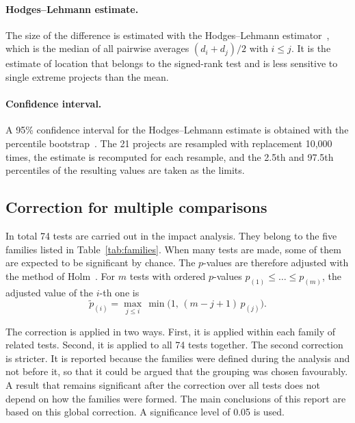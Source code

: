 \documentclass[12pt,a4paper,oneside]{report}
\begin{document}
\paragraph{Hodges--Lehmann estimate.} The size of the difference is
estimated with the Hodges--Lehmann estimator~\cite{hodges1963}, which is the
median of all pairwise averages $(d_i + d_j)/2$ with $i \le j$. It is the
estimate of location that belongs to the signed-rank test and is less
sensitive to single extreme projects than the mean.

\paragraph{Confidence interval.} A 95\% confidence interval for the
Hodges--Lehmann estimate is obtained with the percentile
bootstrap~\cite{efron1979bootstrap}. The 21 projects are resampled with
replacement 10,000 times, the estimate is recomputed for each resample, and
the 2.5th and 97.5th percentiles of the resulting values are taken as the
limits.

\subsection{Correction for multiple comparisons}

In total 74 tests are carried out in the impact analysis. They belong to the
five families listed in Table~\ref{tab:families}. When many tests are made,
some of them are expected to be significant by chance. The $p$-values are
therefore adjusted with the method of Holm~\cite{holm1979}. For $m$ tests
with ordered $p$-values $p_{(1)} \le \dots \le p_{(m)}$, the adjusted value
of the $i$-th one is
\begin{equation}
\tilde{p}_{(i)} = \max_{j \le i}\,\min\bigl(1,\,(m-j+1)\,p_{(j)}\bigr).
\end{equation}

The correction is applied in two ways. First, it is applied within each
family of related tests. Second, it is applied to all 74 tests together. The
second correction is stricter. It is reported because the families were
defined during the analysis and not before it, so that it could be argued
that the grouping was chosen favourably. A result that remains significant
after the correction over all tests does not depend on how the families were
formed. The main conclusions of this report are based on this global
correction. A significance level of 0.05 is used.
\end{document}
